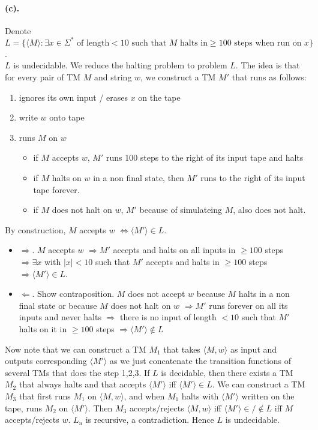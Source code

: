 \documentclass[12pt]{article}
\begin{document}
\paragraph*{(c).} Denote \(L = \{\langle M \rangle : \exists x \in \Sigma^* \text{ of length} < 10 \text{ such that } M \text{ halts in} \geq 100 \text{ steps when run on } x\}\).\\
\(L\) is undecidable. We reduce the halting problem to problem \(L\). The idea is that for every pair of TM \(M\) and string \(w\), we construct a TM \(M'\) that runs as follows:
\begin{enumerate}
  \item ignores its own input / erases \(x\) on the tape
  \item write \(w\) onto tape
  \item runs \(M\) on \(w\)
  \begin{itemize}
    \item if \(M\) accepts \(w\), \(M'\) runs 100 steps to the right of its input tape and halts
    \item if \(M\) halts on \(w\) in a non final state, then \(M'\) runs to the right of its input tape forever.
    \item if \(M\) does not halt on \(w\), \(M'\) because of simulateing \(M\), also does not halt.
  \end{itemize}
\end{enumerate} 
By construction, \(M\) accepts \(w\) \(\Leftrightarrow \langle M'\rangle \in L\). 
\begin{itemize}
  \item \(\Rightarrow\). \(M\) accepts \(w\) \(\Rightarrow M'\) accepts and halts on all inputs in \(\geq 100\) steps \(\Rightarrow \exists x\) with \(|x| < 10\) such that \(M'\) accepts and halts in \(\geq 100\) steps \(\Rightarrow \langle M' \rangle \in L\).
  \item \(\Leftarrow\). Show contraposition. \(M\) does not accept \(w\) because \(M\) halts in a non final state or because \(M\) does not halt on \(w\) \(\Rightarrow M'\) runs forever on all its inputs and never halts \(\Rightarrow\) there is no input of length \(< 10\) such that \(M'\) halts on it in \(\geq 100\) steps \(\Rightarrow \langle M' \rangle \notin L\)
\end{itemize}
Now note that we can construct a TM \(M_1\) that takes \(\langle M, w\rangle\) as input and outputs corresponding \(\langle M' \rangle\) as we just concatenate the transition functions of several TMs that does the step 1,2,3. If \(L\) is decidable, then there exists a TM \(M_2\) that always halts and that accepts \(\langle M'\rangle\) iff \(\langle M'\rangle \in L\). We can construct a TM \(M_3\) that first runs \(M_1\) on \(\langle M, w\rangle\), and when \(M_1\) halts with \(\langle M' \rangle\) written on the tape, runs \(M_2\) on \(\langle M' \rangle\). Then \(M_3\) accepts/rejects \(\langle M, w\rangle\) iff \(\langle M' \rangle \in/\notin L\) iff \(M\) accepts/rejects \(w\). \(L_u\) is recursive, a contradiction. Hence \(L\) is undecidable.
\end{document}
